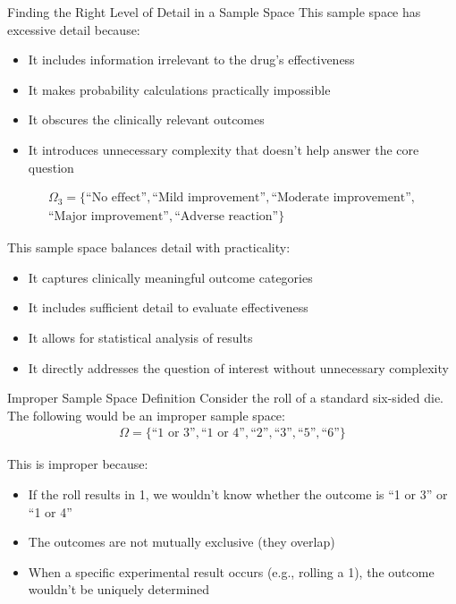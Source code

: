 \begin{itemize}
\begin{exampleboxbreak}{Finding the Right Level of Detail in a Sample Space}
This sample space has excessive detail because:
\begin{itemize}
    \item It includes information irrelevant to the drug's effectiveness
    \item It makes probability calculations practically impossible
    \item It obscures the clinically relevant outcomes
    \item It introduces unnecessary complexity that doesn't help answer the core question
\end{itemize}

\begin{align*}
\Omega_3 = \{\text{``No effect''}, \text{``Mild improvement''}, \text{``Moderate improvement''}, \\ 
\text{``Major improvement''}, \text{``Adverse reaction''}\}
\end{align*}

This sample space balances detail with practicality:
\begin{itemize}
    \item It captures clinically meaningful outcome categories
    \item It includes sufficient detail to evaluate effectiveness
    \item It allows for statistical analysis of results
    \item It directly addresses the question of interest without unnecessary complexity
\end{itemize}
\end{exampleboxbreak}

\begin{exampleboxbreak}{Improper Sample Space Definition}
Consider the roll of a standard six-sided die. The following would be an improper sample space:
\begin{align*}
\Omega = \{\text{``1 or 3''}, \text{``1 or 4''}, \text{``2''}, \text{``3''}, \text{``5''}, \text{``6''}\}
\end{align*}

This is improper because:
\begin{itemize}
    \item If the roll results in 1, we wouldn't know whether the outcome is ``1 or 3'' or ``1 or 4''
    \item The outcomes are not mutually exclusive (they overlap)
    \item When a specific experimental result occurs (e.g., rolling a 1), the outcome wouldn't be uniquely determined
\end{itemize}


\end{exampleboxbreak}
\end{itemize}
